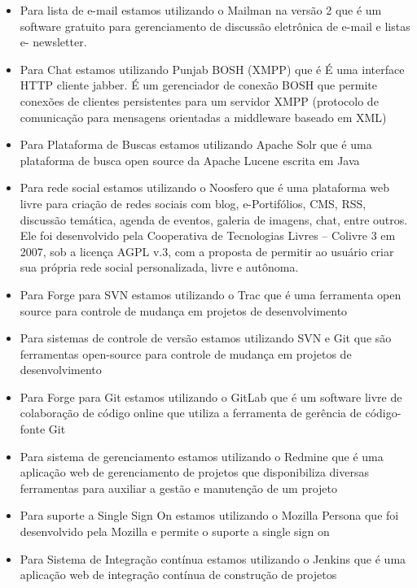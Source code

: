 \begin{itemize}

\item Para lista de e-mail estamos utilizando o Mailman na versão 2 que é um software gratuito para gerenciamento de discussão eletrônica de e-mail e listas e- newsletter.

\item Para Chat estamos utilizando Punjab BOSH (XMPP) que é  É uma interface HTTP cliente jabber. É um gerenciador de conexão BOSH que permite conexões de clientes persistentes para um servidor XMPP (protocolo de comunicação para mensagens orientadas a middleware baseado em XML)

\item Para Plataforma de Buscas estamos utilizando Apache Solr que é uma plataforma de busca open source da Apache Lucene escrita em Java

\item Para rede social estamos utilizando o Noosfero que é uma plataforma web livre para criação de redes sociais com blog, e-Portifólios, CMS, RSS, discussão temática, agenda de eventos, galeria de imagens, chat, entre outros. Ele foi desenvolvido pela Cooperativa de Tecnologias Livres – Colivre 3 em 2007, sob a licença AGPL v.3, com a proposta de permitir ao usuário criar sua própria rede social personalizada, livre e autônoma.

\item Para Forge para SVN estamos utilizando o Trac que é uma ferramenta open source para controle de mudança em projetos de desenvolvimento

\item Para sistemas de controle de versão estamos utilizando SVN e Git que são ferramentas open-source para controle de mudança em projetos de desenvolvimento

\item Para Forge para Git estamos utilizando o GitLab que é um software livre de colaboração de código online que utiliza a ferramenta de gerência de código-fonte Git

\item Para sistema de gerenciamento estamos utilizando o Redmine que é uma aplicação web de gerenciamento de projetos que disponibiliza diversas ferramentas para auxiliar a gestão e manutenção de um projeto

\item Para suporte a Single Sign On estamos utilizando o Mozilla Persona que foi desenvolvido pela Mozilla e permite o suporte a single sign on

\item Para Sistema de Integração contínua estamos utilizando o Jenkins que é uma aplicação web de integração contínua de construção de projetos

\end{itemize}

